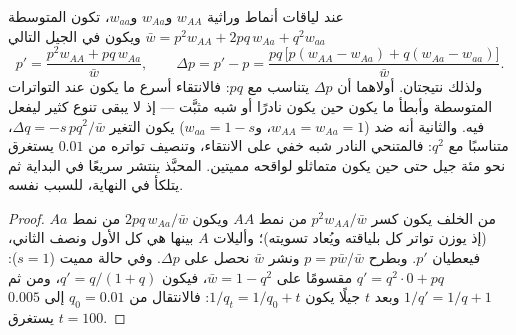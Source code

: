 \begin{theorem}\label{thm:b2:population-genetics:selection}
عند لياقات أنماط وراثية $w_{AA}$ و$w_{Aa}$ و$w_{aa}$، تكون 
المتوسطة $\bar w = p^{2}w_{AA} + 2pq\,w_{Aa} + q^{2}w_{aa}$ ويكون
 في الجيل التالي
\[
p' = \frac{p^{2}w_{AA} + pq\,w_{Aa}}{\bar w}, \qquad
\Delta p = p' - p = \frac{pq\,\bigl[p(w_{AA} - w_{Aa}) + q(w_{Aa} - w_{aa})\bigr]}{\bar w}.
\]
ولذلك نتيجتان. أولاهما أن $\Delta p$ يتناسب مع $pq$: فالانتقاء
أسرع ما يكون عند التواترات المتوسطة وأبطأ ما يكون حين يكون 
نادرًا أو شبه مثبَّت --- إذ لا يبقى تنوع كثير ليفعل فيه.
والثانية أنه ضد   ($w_{AA} = w_{Aa} = 1$، و$w_{aa} =
1 - s$) يكون التغير $\Delta q = -s\,pq^{2}/\bar w$، متناسبًا
مع $q^{2}$: فالمتنحي النادر شبه خفي على الانتقاء،
وتنصيف تواتره من $0.01$ يستغرق نحو مئة جيل
حتى حين يكون متماثلو لواقحه مميتين.   المحبَّذ
ينتشر سريعًا في البداية ثم يتلكأ في النهاية، للسبب
نفسه.
\end{theorem}
\begin{proof}
من الخلف يكون كسر $p^{2}w_{AA}/\bar w$ من نمط $AA$ ويكون
$2pq\,w_{Aa}/\bar w$ من نمط $Aa$ (إذ يوزن تواتر كل 
بلياقته ويُعاد تسويته)؛ وأليلات $A$ بينها هي كل
الأول ونصف الثاني، فيعطيان $p'$. وبطرح $p =
p\bar w/\bar w$ ونشر $\bar w$ نحصل على $\Delta p$. وفي حالة 
مميت ($s = 1$): $q' = q^{2}\cdot 0 + pq$ مقسومًا على $\bar w = 1 -
q^{2}$، فيكون $q' = q/(1 + q)$، ومن ثم $1/q' = 1/q + 1$ وبعد $t$
جيلًا يكون $1/q_t = 1/q_0 + t$: فالانتقال من $q_0 = 0.01$ إلى $0.005$ يستغرق
$t = 100$.
\end{proof}

